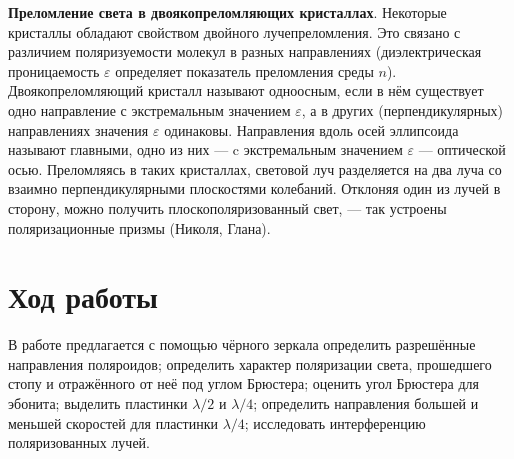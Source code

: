 \documentclass[a4paper,12pt]{article}
\begin{document}
	\textbf{Преломление света в двоякопреломляющих кристаллах}. Некоторые кристаллы обладают свойством двойного лучепреломления. Это связано с различием поляризуемости молекул в разных направлениях (диэлектрическая проницаемость $\varepsilon$ определяет показатель преломления среды $n$).
	Двоякопреломляющий кристалл называют одноосным, если в нём существует одно направление с экстремальным значением $\varepsilon$, а в других (перпендикулярных) направлениях значения $\varepsilon$ одинаковы. Направления вдоль осей эллипсоида называют главными, одно из них --- c экстремальным значением $\varepsilon$ --- оптической осью. Преломляясь в таких кристаллах, световой луч разделяется на два луча со взаимно перпендикулярными плоскостями колебаний. Отклоняя	один из лучей в сторону, можно получить плоскополяризованный свет, --- так устроены поляризационные призмы (Николя, Глана).
	
	\section*{Ход работы}
	В работе предлагается с помощью чёрного зеркала определить разрешённые направления поляроидов; определить характер поляризации света, прошедшего стопу и отражённого от неё под углом Брюстера; оценить угол Брюстера для эбонита; выделить пластинки $\lambda/2$ и $\lambda/4$; определить направления большей и меньшей скоростей для пластинки $\lambda/4$; исследовать интерференцию поляризованных лучей.
\end{document}
